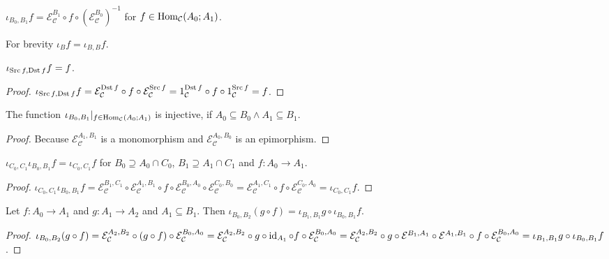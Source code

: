 \begin{defn}
  $\iota_{B_0, B_1} f = \mathcal{E}_{\mathcal{C}}^{B_1} \circ f \circ
  (\mathcal{E}_{\mathcal{C}}^{B_0})^{-1}$ for $f \in
  \operatorname{Hom}_{\mathcal{C}} (A_0 ; A_1)$.
\end{defn}

For brevity $\iota_B f = \iota_{B, B} f$.

\begin{prop}
  $\iota_{\operatorname{Src} f, \operatorname{Dst} f} f = f$.
\end{prop}

\begin{proof}
  $\iota_{\operatorname{Src} f, \operatorname{Dst} f} f = \mathcal{E}_\mathcal{C}^{\operatorname{Dst} f} \circ f \circ \mathcal{E}_\mathcal{C}^{\operatorname{Src} f} =
  1_{\mathcal{C}}^{\operatorname{Dst} f} \circ f \circ 1_{\mathcal{C}}^{\operatorname{Src} f} = f$.
\end{proof}

\begin{prop}
  The function $\iota_{B_0, B_1} |_{f \in \operatorname{Hom}_{\mathcal{C}} (A_0 ;
  A_1)}$ is injective, if $A_0 \subseteq B_0 \wedge A_1 \subseteq B_1$.
\end{prop}

\begin{proof}
  Because $\mathcal{E}_{\mathcal{C}}^{A_1,B_1}$ is a monomorphism and $\mathcal{E}_{\mathcal{C}}^{A_0,B_0}$ is an epimorphism.
\end{proof}

\begin{prop}
  $\iota_{C_0, C_1} \iota_{B_0, B_1} f = \iota_{C_0, C_1} f$ for $B_0
  \supseteq A_0 \cap C_0$, $B_1 \supseteq A_1 \cap C_1$ and $f : A_0
  \rightarrow A_1$.
\end{prop}

\begin{proof}
  $\iota_{C_0, C_1} \iota_{B_0, B_1} f = \mathcal{E}_{\mathcal{C}}^{B_1,C_1}
  \circ \mathcal{E}_{\mathcal{C}}^{A_1,B_1} \circ f \circ \mathcal{E}_{\mathcal{C}}^{B_0,A_0} \circ
  \mathcal{E}_{\mathcal{C}}^{C_0,B_0} = \mathcal{E}_{\mathcal{C}}^{A_1,C_1} \circ f \circ \mathcal{E}_{\mathcal{C}}^{C_0,A_0} =
  \iota_{C_0,C_1} f$.
\end{proof}

\begin{prop}
  Let $f : A_0 \rightarrow A_1$ and $g : A_1 \rightarrow A_2$ and $A_1
  \subseteq B_1$. Then $\iota_{B_0, B_2} (g \circ f) = \iota_{B_1, B_1} g
  \circ \iota_{B_0, B_1} f$.
\end{prop}

\begin{proof}
  $\iota_{B_0, B_2} (g \circ f) = \mathcal{E}_{\mathcal{C}}^{A_2,B_2}
  \circ (g \circ f) \circ \mathcal{E}_{\mathcal{C}}^{B_0,A_0} = \mathcal{E}_{\mathcal{C}}^{A_2,B_2} \circ g \circ \operatorname{id}_{A_1} \circ f
  \circ \mathcal{E}_{\mathcal{C}}^{B_0,A_0} = \mathcal{E}_{\mathcal{C}}^{A_2,B_2} \circ g \circ \mathcal{E}^{B_1,A_1}
  \circ \mathcal{E}^{A_1,B_1} \circ f \circ \mathcal{E}_{\mathcal{C}}^{B_0,A_0} = \iota_{B_1, B_1} g \circ \iota_{B_0,
  B_1} f$.
\end{proof}

